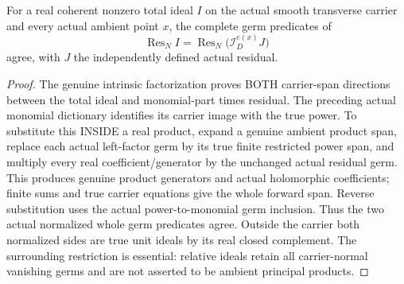 \begin{theorem}
\label{hir:sharp-actual-single-total-normalized-power-residual-factor}
\leanok
For a real coherent nonzero total ideal $I$ on the actual smooth transverse
carrier and every actual ambient point $x$, the complete germ predicates of
\[
 \operatorname{Res}_N I
   =\operatorname{Res}_N\bigl(\mathcal I_D^{e(x)}J\bigr)
\]
agree, with $J$ the independently defined actual residual.
\end{theorem}
\begin{proof}
The genuine intrinsic factorization proves BOTH carrier-span directions
between the total ideal and monomial-part times residual. The preceding
actual monomial dictionary identifies its carrier image with the true power.
To substitute this INSIDE a real product, expand a genuine ambient product
span, replace each actual left-factor germ by its true finite restricted
power span, and multiply every real coefficient/generator by the unchanged
actual residual germ. This produces genuine product generators and actual
holomorphic coefficients; finite sums and true carrier equations give the
whole forward span. Reverse substitution uses the actual power-to-monomial
germ inclusion. Thus the two actual normalized whole germ predicates agree.
Outside the carrier both normalized sides are true unit ideals by its real
closed complement. The surrounding restriction is essential: relative
ideals retain all carrier-normal vanishing germs and are not asserted to
be ambient principal products.
\end{proof}

